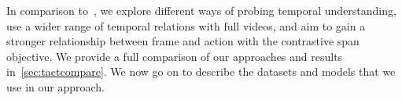 In comparison to~\citet{bagad2023testoftime}, we explore different ways of
probing temporal understanding, use a wider range of temporal relations with
full videos, and aim to gain a stronger relationship between frame and action
with the contrastive span objective. We provide a full comparison of our
approaches and results in~\cref{sec:tactcompare}. We now go on to describe the
datasets and models that we use in our approach.
